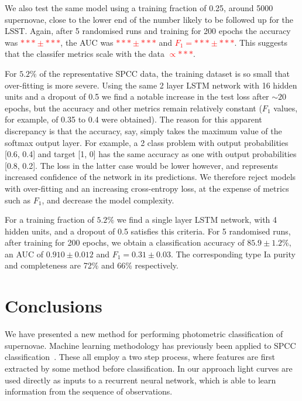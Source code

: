 \documentclass[nofootinbib,amsmath,amssymb,10pt,eqsecnum, twocolumn]{revtex4-1}
\newcommand\comment[1]{\textcolor{red}{#1}}
\begin{document}
We also test the same model using a training fraction of 0.25, around 5000 supernovae, close to the lower  end of the number likely to be followed up for the LSST. Again, after 5 randomised runs and training for 200 epochs the accuracy was \comment{$***\pm***$}, the AUC was \comment{$***\pm***$} and \comment{$F_1 =***\pm***$}. This suggests that the classifer metrics scale with the data \comment{$\propto***$}.

For $5.2\%$ of the representative SPCC data, the training dataset is so small that over-fitting is more severe. Using the same 2 layer LSTM network with 16 hidden units and a dropout of 0.5 we find a notable increase in the test loss after $\sim 20$ epochs, but the accuracy and other metrics remain relatively constant ($F_1$ values, for example, of 0.35 to 0.4 were obtained). The reason for this apparent discrepancy is that the accuracy, say, simply takes the maximum value of the softmax output layer. For example, a 2 class problem with output probabilities [0.6, 0.4] and target [1, 0] has the same accuracy as one with output probabilities [0.8, 0.2]. The loss in the latter case would be lower however, and represents increased confidence of the network in its predictions. We therefore reject models with over-fitting and an increasing cross-entropy loss, at the expense of metrics such as $F_1$, and decrease the model complexity. 

For a training fraction of  $5.2\%$ we find a single layer LSTM network, with 4 hidden units, and a dropout of 0.5 satisfies this criteria. For 5 randomised runs, after training for  200 epochs, we obtain a classification accuracy of $85.9 \pm 1.2$\%, an AUC of $0.910 \pm 0.012$ and $F_1 = 0.31 \pm 0.03$. The corresponding type Ia purity and completeness are 72\% and 66\% respectively.

\section{Conclusions}

We have presented a new method for performing  photometric classification of supernovae. Machine learning methodology has previously been applied to SPCC classification~\cite{Newling:2010bp, Karpenka:2012pm, Lochner:2016hbn}. These all employ a two step process, where features are first extracted by some method before classification. In our approach light curves are used directly as inputs to a recurrent neural network, which is able to learn information from the sequence of observations.
\end{document}
